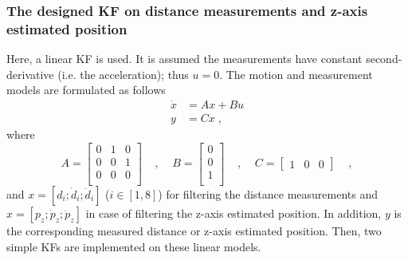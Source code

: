 \documentclass{article}
\begin{document}
\subsubsection{The designed KF on distance measurements and z-axis estimated position}
Here, a linear KF is used. It is assumed the measurements have constant second-derivative (i.e. the acceleration); thus $u=0$.
The motion and measurement models are formulated as follows
\begin{equation} \label{Eq_KF01}
\begin{split}
\dot{x} &= Ax + Bu \\
y &= Cx \;,
\end{split}
\end{equation}
where 
\begin{equation} \label{Eq_KF02}
A = \left[\begin{matrix}
0 & 1 & 0 \\
0 & 0 & 1 \\
0 & 0 & 0 \\
\end{matrix}\right] \;\;\;\;,\;\;\;\;
B = \left[\begin{matrix}
0 \\
0 \\
1 \\
\end{matrix}\right] \;\;\;\;,\;\;\;\;
C = \left[\begin{matrix}
1 & 0 & 0
\end{matrix}\right] \;\;\;\;,
\end{equation}
and $x = [d_i;\dot{d}_i;\ddot{d}_i]$ ($i \in [1,8]$) for filtering the distance measurements and $x = [p_z;\dot{p}_z;\ddot{p}_z]$ in case of filtering the z-axis estimated position.
In addition, $y$ is the corresponding measured distance or z-axis estimated position.
Then, two simple KFs are implemented on these linear models.
\end{document}
